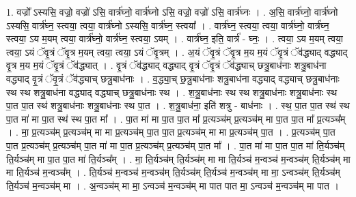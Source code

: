 \documentclass[17pt]{extarticle}
\begin{document}
1. वज्रो᳚ ऽस्यसि॒ वज्रो॒ वज्रो॑ ऽसि॒ वार्त्र॑घ्नो॒ वार्त्र॑घ्नो ऽसि॒ वज्रो॒ वज्रो॑ ऽसि॒ वार्त्र॑घ्नः । . अ॒सि॒ वार्त्र॑घ्नो॒ वार्त्र॑घ्नो ऽस्यसि॒ वार्त्र॑घ्न॒ स्त्वया॒ त्वया॒ वार्त्र॑घ्नो ऽस्यसि॒ वार्त्र॑घ्न॒ स्त्वया᳚ । . वार्त्र॑घ्न॒ स्त्वया॒ त्वया॒ वार्त्र॑घ्नो॒ वार्त्र॑घ्न॒ स्त्वया॒ ऽय म॒यम् त्वया॒ वार्त्र॑घ्नो॒ वार्त्र॑घ्न॒ स्त्वया॒ ऽयम् । . वार्त्र॑घ्न॒ इति॒ वार्त्र॑ - घ्नः॒ । . त्वया॒ ऽय म॒यम् त्वया॒ त्वया॒ ऽयं ॅवृ॒त्रं ॅवृ॒त्र म॒यम् त्वया॒ त्वया॒ ऽयं ॅवृ॒त्रम् । . अ॒यं ॅवृ॒त्रं ॅवृ॒त्र म॒य म॒यं ॅवृ॒त्रं ॅव॑द्ध्याद् वद्ध्याद् वृ॒त्र म॒य म॒यं ॅवृ॒त्रं ॅव॑द्ध्यात् । . वृ॒त्रं ॅव॑द्ध्याद् वद्ध्याद् वृ॒त्रं ॅवृ॒त्रं ॅव॑द्ध्याच् छत्रु॒बाध॑नाः शत्रु॒बाध॑ना वद्ध्याद् वृ॒त्रं ॅवृ॒त्रं ॅव॑द्ध्याच् छत्रु॒बाध॑नाः । . व॒द्ध्या॒च् छ॒त्रु॒बाध॑नाः शत्रु॒बाध॑ना वद्ध्याद् वद्ध्याच् छत्रु॒बाध॑नाः स्थ स्थ शत्रु॒बाध॑ना वद्ध्याद् वद्ध्याच् छत्रु॒बाध॑नाः स्थ । . श॒त्रु॒बाध॑नाः स्थ स्थ शत्रु॒बाध॑नाः शत्रु॒बाध॑नाः स्थ पा॒त पा॒त स्थ॑ शत्रु॒बाध॑नाः शत्रु॒बाध॑नाः स्थ पा॒त । . श॒त्रु॒बाध॑ना॒ इति॑ शत्रु - बाध॑नाः । . स्थ॒ पा॒त पा॒त स्थ॑ स्थ पा॒त मा॑ मा पा॒त स्थ॑ स्थ पा॒त मा᳚ । . पा॒त मा॑ मा पा॒त पा॒त मा᳚ प्र॒त्यञ्च॑म् प्र॒त्यञ्च॑म् मा पा॒त पा॒त मा᳚ प्र॒त्यञ्च᳚म् । . मा॒ प्र॒त्यञ्च॑म् प्र॒त्यञ्च॑म् मा मा प्र॒त्यञ्च॑म् पा॒त पा॒त प्र॒त्यञ्च॑म् मा मा प्र॒त्यञ्च॑म् पा॒त । . प्र॒त्यञ्च॑म् पा॒त पा॒त प्र॒त्यञ्च॑म् प्र॒त्यञ्च॑म् पा॒त मा॑ मा पा॒त प्र॒त्यञ्च॑म् प्र॒त्यञ्च॑म् पा॒त मा᳚ । . पा॒त मा॑ मा पा॒त पा॒त मा॑ ति॒र्यञ्च॑म् ति॒र्यञ्च॑म् मा पा॒त पा॒त मा॑ ति॒र्यञ्च᳚म् । . मा॒ ति॒र्यञ्च॑म् ति॒र्यञ्च॑म् मा मा ति॒र्यञ्च॑ म॒न्वञ्च॑ म॒न्वञ्च॑म् ति॒र्यञ्च॑म् मा मा ति॒र्यञ्च॑ म॒न्वञ्च᳚म् । . ति॒र्यञ्च॑ म॒न्वञ्च॑ म॒न्वञ्च॑म् ति॒र्यञ्च॑म् ति॒र्यञ्च॑ म॒न्वञ्च॑म् मा मा॒ ऽन्वञ्च॑म् ति॒र्यञ्च॑म् ति॒र्यञ्च॑ म॒न्वञ्च॑म् मा । . अ॒न्वञ्च॑म् मा मा॒ ऽन्वञ्च॑ म॒न्वञ्च॑म् मा पात पात मा॒ ऽन्वञ्च॑ म॒न्वञ्च॑म् मा पात । \newline
\end{document}
